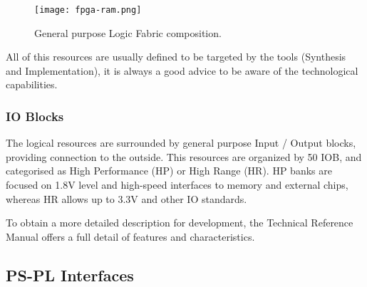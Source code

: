 \begin{figure}[htp]
	\centering
	\texttt{[image: fpga-ram.png]}
	\caption{General purpose Logic Fabric composition.} \label{fig:fpga-ram}
\end{figure}

All of this resources are usually defined to be targeted by the tools (Synthesis and Implementation), it is always a good advice to be aware of the technological capabilities.

\subsubsection{IO Blocks}

The logical resources are surrounded by general purpose Input / Output blocks, providing connection to the outside. This resources are organized by 50 IOB, and categorised as High Performance (HP) or High Range (HR). HP banks are focused on 1.8V level and high-speed interfaces to memory and external chips, whereas HR allows up to 3.3V and other IO standards.

To obtain a more detailed description for development, the Technical Reference Manual \cite[p.~38]{UG585} offers a full detail of features and characteristics.

\subsection{PS-PL Interfaces}

